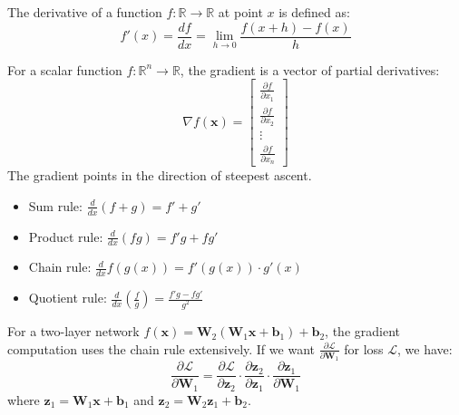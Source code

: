 \begin{definition}[Derivative]
The derivative of a function $f: \mathbb{R} \to \mathbb{R}$ at point $x$ is defined as:
\begin{equation}
f'(x) = \frac{df}{dx} = \lim_{h \to 0} \frac{f(x + h) - f(x)}{h}
\end{equation}
\end{definition}

\begin{definition}[Gradient]
For a scalar function $f: \mathbb{R}^n \to \mathbb{R}$, the gradient is a vector of partial derivatives:
\begin{equation}
\nabla f(\mathbf{x}) = \begin{bmatrix}
\frac{\partial f}{\partial x_1} \\
\frac{\partial f}{\partial x_2} \\
\vdots \\
\frac{\partial f}{\partial x_n}
\end{bmatrix}
\end{equation}
The gradient points in the direction of steepest ascent.
\end{definition}

\begin{property}
\begin{itemize}
    \item Sum rule: $\frac{d}{dx}(f + g) = f' + g'$
    \item Product rule: $\frac{d}{dx}(fg) = f'g + fg'$
    \item Chain rule: $\frac{d}{dx}f(g(x)) = f'(g(x)) \cdot g'(x)$
    \item Quotient rule: $\frac{d}{dx}\left(\frac{f}{g}\right) = \frac{f'g - fg'}{g^2}$
\end{itemize}
\end{property}

\begin{example}
For a two-layer network $f(\mathbf{x}) = \mathbf{W}_2(\mathbf{W}_1\mathbf{x} + \mathbf{b}_1) + \mathbf{b}_2$, the gradient computation uses the chain rule extensively. If we want $\frac{\partial \mathcal{L}}{\partial \mathbf{W}_1}$ for loss $\mathcal{L}$, we have:
\begin{equation}
\frac{\partial \mathcal{L}}{\partial \mathbf{W}_1} = \frac{\partial \mathcal{L}}{\partial \mathbf{z}_2} \cdot \frac{\partial \mathbf{z}_2}{\partial \mathbf{z}_1} \cdot \frac{\partial \mathbf{z}_1}{\partial \mathbf{W}_1}
\end{equation}
where $\mathbf{z}_1 = \mathbf{W}_1\mathbf{x} + \mathbf{b}_1$ and $\mathbf{z}_2 = \mathbf{W}_2\mathbf{z}_1 + \mathbf{b}_2$.
\end{example}

